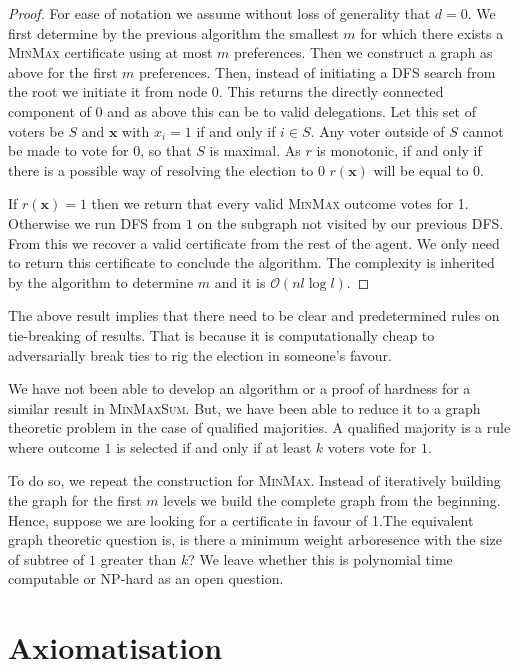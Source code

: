 \documentclass[11pt,a4paper, titlepage]{article}
\theoremstyle{definition}
\let\vec\mathbf
\begin{document}
\begin{proof}

    For ease of notation we assume without loss of generality that $d = 0$.
    We first determine by the previous algorithm the smallest $m$ for which there exists a \textsc{MinMax} certificate using at most $m$ preferences.
    Then we construct a graph as above for the first $m$ preferences.
    Then, instead of initiating a DFS search from the root we initiate it from node $0$.
    This returns the directly connected component of $0$ and as above this can be to valid delegations.
    Let this set of voters be $S$ and $\vec{x}$ with $x_i = 1$ if and only if $i \in S$.
    Any voter outside of $S$  cannot be made to vote for $0$, so that $S$ is maximal. As $r$ is monotonic, if and only if  there is a possible way of resolving the election to $0$ $r(\vec{x})$ will be equal to 0.

    If $r(\vec{x}) = 1$ then we return that every valid \textsc{MinMax} outcome votes for 1.
    Otherwise we run DFS from $1$ on the subgraph not visited by our previous DFS.
    From this we recover a valid certificate from the rest of the agent.
    We only need to return this certificate to conclude the algorithm.
    The complexity is inherited by the algorithm to determine $m$ and it is $\mathcal{O}(nl \log l)$.
\end{proof}

The above result implies that there need to be clear and predetermined rules on tie-breaking of results.
That is because it is computationally cheap to adversarially break ties to rig the election in someone's favour.

We have not been able to develop an algorithm or a proof of hardness for a similar result in \textsc{MinMaxSum}.
But, we have been able to reduce it to a graph theoretic problem in the case of qualified majorities.
A qualified majority is a rule where outcome $1$ is selected if and only if at least $k$ voters vote for $1$.

To do so, we repeat the construction for \textsc{MinMax}. 
Instead of iteratively building the graph for the first $m$ levels we build the complete graph from the beginning.
Hence, suppose  we are looking for a certificate in favour of 1.The equivalent graph theoretic question is, is there a minimum weight arboresence with the size of subtree of $1$ greater than $k$? We leave whether this is polynomial time computable or NP-hard as an open question.

\newpage
\section{Axiomatisation}
\end{document}
